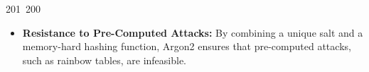 201~200~\documentclass{article}
\begin{document}
	                                                                                                                                                                                                                                                                                                	                                                                                                                                        	    	                                                                                                	                                                                                                                                                                                                                                                                                                                                	                                                                        	                                                                        	                                                                                                                                        	                                                                \begin{itemize}
	                                                                                                                                                                                                                                                                                                	                                                                                                                                        	    	                                                                                                	                                                                                                                                                                                                                                                                                                                                	                                                                        	                                                                        	                                                                                                                                        	                                                                    \item \textbf{Resistance to Pre-Computed Attacks:} By combining a unique salt and a memory-hard hashing function, Argon2 ensures that pre-computed attacks, such as rainbow tables, are infeasible.

\end{itemize}
\end{document}
